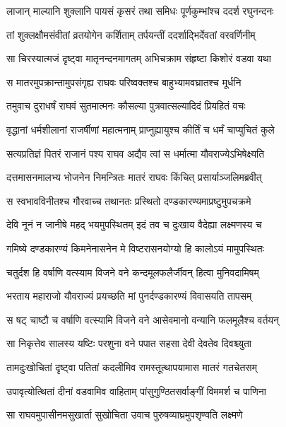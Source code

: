 \twolineshloka
{लाजान् माल्यानि शुक्लानि पायसं कृसरं तथा}
{समिधः पूर्णकुम्भांश्च ददर्श रघुनन्दनः} %

\twolineshloka
{तां शुक्लक्षौमसंवीतां व्रतयोगेन कर्शिताम्}
{तर्पयन्तीं ददर्शाद्भिर्देवतां वरवर्णिनीम्} %

\twolineshloka
{सा चिरस्यात्मजं दृष्ट्वा मातृनन्दनमागतम्}
{अभिचक्राम संहृष्टा किशोरं वडवा यथा} %

\twolineshloka
{स मातरमुपक्रान्तामुपसंगृह्य राघवः}
{परिष्वक्तश्च बाहुभ्यामवघ्रातश्च मूर्धनि} %

\twolineshloka
{तमुवाच दुराधर्षं राघवं सुतमात्मनः}
{कौसल्या पुत्रवात्सल्यादिदं प्रियहितं वचः} %

\twolineshloka
{वृद्धानां धर्मशीलानां राजर्षीणां महात्मनाम्}
{प्राप्नुह्यायुश्च कीर्तिं च धर्मं चाप्युचितं कुले} %

\twolineshloka
{सत्यप्रतिज्ञं पितरं राजानं पश्य राघव}
{अद्यैव त्वां स धर्मात्मा यौवराज्येऽभिषेक्ष्यति} %

\twolineshloka
{दत्तमासनमालभ्य भोजनेन निमन्त्रितः}
{मातरं राघवः किंचित् प्रसार्याञ्जलिमब्रवीत्} %

\twolineshloka
{स स्वभावविनीतश्च गौरवाच्च तथानतः}
{प्रस्थितो दण्डकारण्यमाप्रष्टुमुपचक्रमे} %

\twolineshloka
{देवि नूनं न जानीषे महद् भयमुपस्थितम्}
{इदं तव च दुःखाय वैदेह्या लक्ष्मणस्य च} %

\twolineshloka
{गमिष्ये दण्डकारण्यं किमनेनासनेन मे}
{विष्टरासनयोग्यो हि कालोऽयं मामुपस्थितः} %

\twolineshloka
{चतुर्दश हि वर्षाणि वत्स्याम विजने वने}
{कन्दमूलफलैर्जीवन् हित्वा मुनिवदामिषम्} %

\twolineshloka
{भरताय महाराजो यौवराज्यं प्रयच्छति}
{मां पुनर्दण्डकारण्यं विवासयति तापसम्} %

\twolineshloka
{स षट् चाष्टौ च वर्षाणि वत्स्यामि विजने वने}
{आसेवमानो वन्यानि फलमूलैश्च वर्तयन्} %

\twolineshloka
{सा निकृत्तेव सालस्य यष्टिः परशुना वने}
{पपात सहसा देवी देवतेव दिवश्च्युता} %

\twolineshloka
{तामदुःखोचितां दृष्ट्वा पतितां कदलीमिव}
{रामस्तूत्थापयामास मातरं गतचेतसम्} %

\twolineshloka
{उपावृत्योत्थितां दीनां वडवामिव वाहिताम्}
{पांसुगुण्ठितसर्वाङ्गीं विममर्श च पाणिना} %

\twolineshloka
{सा राघवमुपासीनमसुखार्ता सुखोचिता}
{उवाच पुरुषव्याघ्रमुपशृण्वति लक्ष्मणे} %

